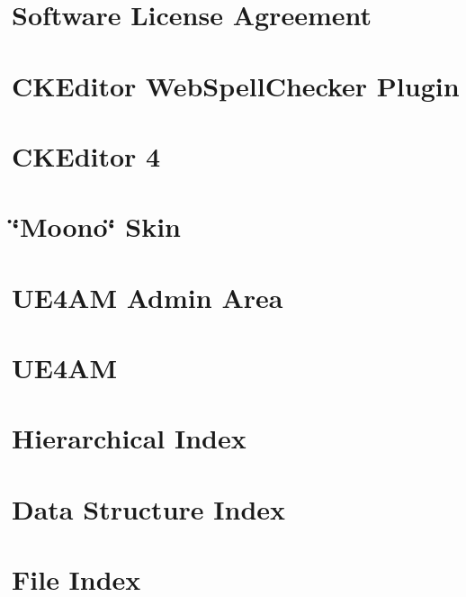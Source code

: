 \documentclass[twoside]{book}
\begin{document}
\chapter{Software License Agreement}
\label{md_admin_js_plugins_ckeditor_plugins_wsc_LICENSE}
\hypertarget{md_admin_js_plugins_ckeditor_plugins_wsc_LICENSE}{}

\chapter{C\-K\-Editor Web\-Spell\-Checker Plugin}
\label{md_admin_js_plugins_ckeditor_plugins_wsc_README}
\hypertarget{md_admin_js_plugins_ckeditor_plugins_wsc_README}{}

\chapter{C\-K\-Editor 4}
\label{md_admin_js_plugins_ckeditor_README}
\hypertarget{md_admin_js_plugins_ckeditor_README}{}

\chapter{\char`\"{}\-Moono\char`\"{} Skin}
\label{md_admin_js_plugins_ckeditor_skins_moono_readme}
\hypertarget{md_admin_js_plugins_ckeditor_skins_moono_readme}{}

\chapter{U\-E4\-A\-M Admin Area}
\label{md_admin_README}
\hypertarget{md_admin_README}{}

\chapter{U\-E4\-A\-M}
\label{md_README}
\hypertarget{md_README}{}

\chapter{Hierarchical Index}

\chapter{Data Structure Index}

\chapter{File Index}

\end{document}
